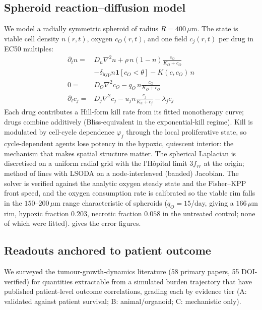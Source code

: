 \documentclass{article}
\begin{document}
\subsection{Spheroid reaction--diffusion model}
\label{sec:model}

We model a radially symmetric spheroid of radius $R = 400\,\mu$m. The state
is viable cell density $n(r,t)$, oxygen $c_O(r,t)$, and one field
$c_j(r,t)$ per drug in EC50 multiples:
\begin{align}
\partial_t n ={}& D_n \nabla^2 n
 + \rho\, n (1-n) \tfrac{c_O}{K_O + c_O} \nonumber\\
 &- \delta_{\text{hyp}} n \mathbf{1}[c_O < \theta]
 - K(c, c_O)\, n \\
0 ={}& D_O \nabla^2 c_O - q_O\, n \tfrac{c_O}{K_O + c_O} \\
\partial_t c_j ={}& D_j \nabla^2 c_j
 - u_j n \tfrac{c_j}{K_u + c_j} - \lambda_j c_j
\end{align}
Each drug contributes a Hill-form kill rate from its fitted monotherapy
curve; drugs combine additively (Bliss-equivalent in the exponential-kill
regime). Kill is modulated by cell-cycle dependence $\varphi_j$ through the
local proliferative state, so cycle-dependent agents lose potency in the
hypoxic, quiescent interior: the mechanism that makes spatial structure
matter. The spherical Laplacian is discretised on a uniform radial grid with
the l'H\^opital limit $3f_{rr}$ at the origin; method of lines with LSODA on
a node-interleaved (banded) Jacobian. The solver is verified against the
analytic oxygen steady state and the Fisher--KPP front speed, and the oxygen
consumption rate is calibrated so the viable rim falls in the
$150$--$200\,\mu$m range characteristic of spheroids ($q_O = 15$/day, giving
a $166\,\mu$m rim, hypoxic fraction $0.203$, necrotic fraction $0.058$ in the
untreated control; none of which were fitted).  gives the
error figures.

\subsection{Readouts anchored to patient outcome}
\label{sec:readouts}

We surveyed the tumour-growth-dynamics literature (58 primary papers, 55
DOI-verified) for quantities extractable from a simulated burden trajectory
that have published patient-level outcome correlations, grading each by
evidence tier (A: validated against patient survival; B: animal/organoid;
C: mechanistic only).
\end{document}
